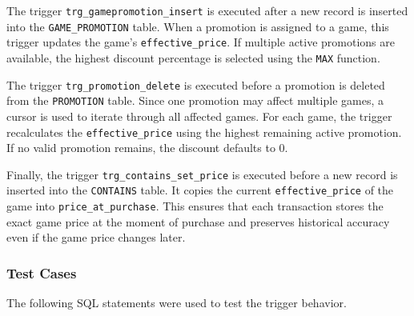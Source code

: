 The trigger \texttt{trg\_gamepromotion\_insert} is executed after a new record is inserted into the \texttt{GAME\_PROMOTION} table. 
When a promotion is assigned to a game, this trigger updates the game’s \texttt{effective\_price}. 
If multiple active promotions are available, the highest discount percentage is selected using the \texttt{MAX} function.

The trigger \texttt{trg\_promotion\_delete} is executed before a promotion is deleted from the \texttt{PROMOTION} table. 
Since one promotion may affect multiple games, a cursor is used to iterate through all affected games. 
For each game, the trigger recalculates the \texttt{effective\_price} using the highest remaining active promotion. 
If no valid promotion remains, the discount defaults to 0.

Finally, the trigger \texttt{trg\_contains\_set\_price} is executed before a new record is inserted into the \texttt{CONTAINS} table. 
It copies the current \texttt{effective\_price} of the game into \texttt{price\_at\_purchase}. 
This ensures that each transaction stores the exact game price at the moment of purchase and preserves historical accuracy even if the game price changes later.
\subsubsection{Test Cases}

The following SQL statements were used to test the trigger behavior.

